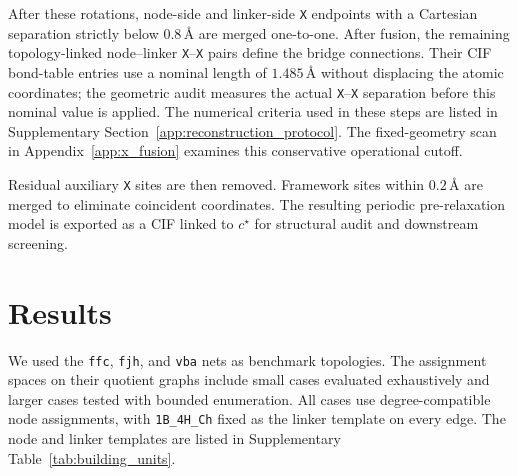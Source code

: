 \documentclass[a5paper, 10pt]{article}
\begin{document}
After these rotations, node-side and linker-side \texttt{X} endpoints with a Cartesian separation strictly below $0.8\,\text{\AA}$ are merged one-to-one. After fusion, the remaining topology-linked node--linker \texttt{X}--\texttt{X} pairs define the bridge connections. Their CIF bond-table entries use a nominal length of $1.485\,\text{\AA}$ without displacing the atomic coordinates; the geometric audit measures the actual \texttt{X}--\texttt{X} separation before this nominal value is applied. The numerical criteria used in these steps are listed in Supplementary Section~\ref{app:reconstruction_protocol}. The fixed-geometry scan in Appendix~\ref{app:x_fusion} examines this conservative operational cutoff.

Residual auxiliary \texttt{X} sites are then removed. Framework sites within $0.2\,\text{\AA}$ are merged to eliminate coincident coordinates. The resulting periodic pre-relaxation model is exported as a CIF linked to $c^\star$ for structural audit and downstream screening.

\section{Results}

We used the \texttt{ffc}, \texttt{fjh}, and \texttt{vba} nets as benchmark topologies. The assignment spaces on their quotient graphs include small cases evaluated exhaustively and larger cases tested with bounded enumeration. All cases use degree-compatible node assignments, with \texttt{1B\_4H\_Ch} fixed as the linker template on every edge. The node and linker templates are listed in Supplementary Table~\ref{tab:building_units}.
\end{document}
